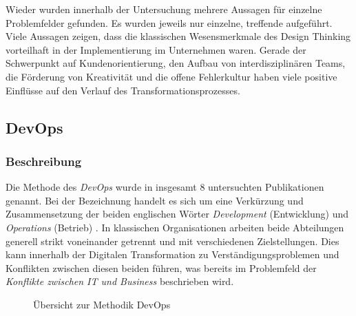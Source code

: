 Wieder wurden innerhalb der Untersuchung mehrere Aussagen für einzelne Problemfelder gefunden. Es wurden jeweils nur einzelne, treffende aufgeführt. Viele Aussagen zeigen, dass die klassischen Wesensmerkmale des Design Thinking vorteilhaft in der Implementierung im Unternehmen waren. Gerade der Schwerpunkt auf Kundenorientierung, den Aufbau von interdisziplinären Teams, die Förderung von Kreativität und die offene Fehlerkultur haben viele positive Einflüsse auf den Verlauf des Transformationsprozesses.
 
\subsection{DevOps}

\subsubsection{Beschreibung}

Die Methode des \textit{DevOps} wurde in insgesamt 8 untersuchten Publikationen genannt. Bei der Bezeichnung handelt es sich um eine Verkürzung und Zusammensetzung der beiden englischen Wörter \textit{Development} (Entwicklung) und \textit{Operations} (Betrieb) \cite[S. 23]{alt_innovationsorientiertes_2017}. In klassischen Organisationen arbeiten beide Abteilungen generell strikt voneinander getrennt und mit verschiedenen Zielstellungen. Dies kann innerhalb der Digitalen Transformation zu Verständigungsproblemen und Konflikten zwischen diesen beiden führen, was bereits im Problemfeld der \textit{Konflikte zwischen IT und Business} beschrieben wird.


\begin{figure}[H]
	\centering
	\caption[Übersicht zur Methodik DevOps]{Übersicht zur Methodik DevOps \protect \cite[S. 28]{alt_innovationsorientiertes_2017}}
	\label{fig:devops}
\end{figure}


